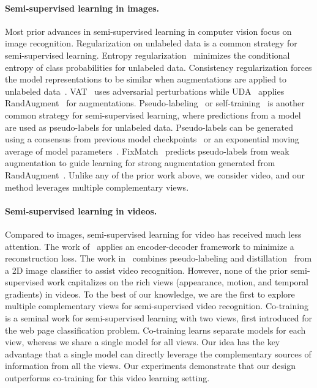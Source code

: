 \documentclass[10pt,twocolumn,letterpaper]{article}
\begin{document}
\paragraph{Semi-supervised learning in images.}
Most prior advances in semi-supervised learning in computer vision focus on 
image recognition. Regularization on unlabeled data is a common strategy {for semi-supervised learning}. Entropy regularization~\cite{grandvalet2005semi} minimizes the conditional entropy of class probabilities for unlabeled data. Consistency regularization forces the model representations to be similar when augmentations are applied to unlabeled data~\cite{sajjadi2016regularization}. 
VAT~\cite{miyato2018virtual} uses adversarial perturbations while UDA~\cite{uda} applies  RandAugment~\cite{randaug} for augmentations.
Pseudo-labeling~\cite{lee2013pseudo, yalniz2019billion} or self-training~\cite{Xie_2020_CVPR} is another common strategy for semi-supervised learning, 
{where} predictions from a model {are used} as pseudo-labels for unlabeled data. 
Pseudo-labels can be generated using a consensus from previous model
checkpoints~\cite{temporalensem} or an exponential moving average of model parameters~\cite{meanteacher}.
FixMatch~\cite{fixmatch} predicts pseudo-labels from weak augmentation to guide learning for strong augmentation generated from RandAugment~\cite{randaug}.  
{Unlike any of the prior work above, we consider video, and our method leverages multiple complementary views. 
}



\paragraph{Semi-supervised learning in videos.}
Compared to images, semi-supervised learning for video has received much less attention. 
The work of~\cite{zeng2017semi} applies an encoder-decoder framework to minimize a reconstruction loss.
The work in~\cite{videossl} combines pseudo-labeling and distillation~\cite{girdhar2019distinit} from a 2D image classifier to assist video recognition. 
However, {none of} the prior semi-supervised work capitalizes on the rich views (appearance, motion, and temporal gradients) in videos. To the best of our knowledge, we are the first to explore multiple 
complementary views for semi-supervised video recognition.
Co-training~\cite{blum1998combining} is a seminal work for semi-supervised learning with two views, first introduced for the web page classification problem.
{Co-training learns separate models for each view, whereas we share a single model for all views. }
{Our idea has the key advantage that} a single model can directly leverage the complementary sources of information from all the views. 
{Our experiments} demonstrate that our design  {outperforms co-training for this video learning setting.}
\end{document}
